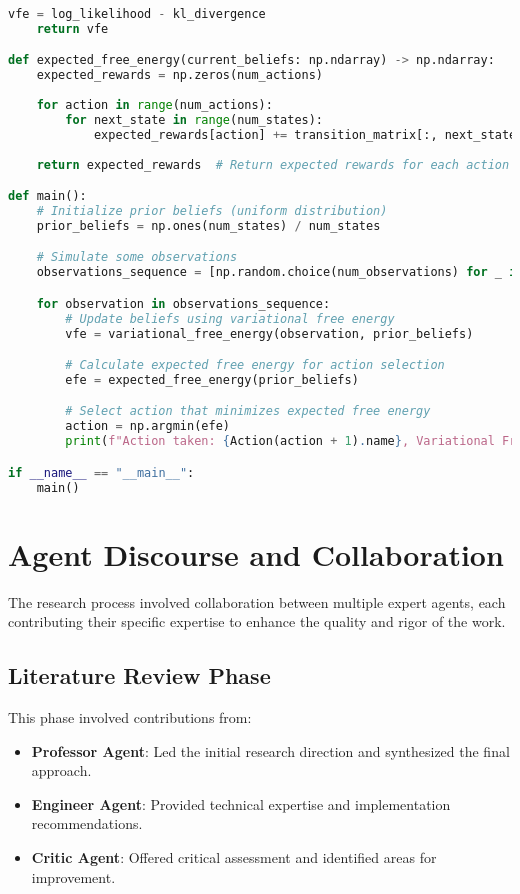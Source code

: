 \documentclass[11pt,a4paper]{article}
\begin{document}
\begin{lstlisting}[language=Python, caption={Full implementation code}]
    vfe = log_likelihood - kl_divergence
    return vfe

def expected_free_energy(current_beliefs: np.ndarray) -> np.ndarray:
    expected_rewards = np.zeros(num_actions)
    
    for action in range(num_actions):
        for next_state in range(num_states):
            expected_rewards[action] += transition_matrix[:, next_state, action] * reward_function(State(next_state + 1), Action(action + 1))
    
    return expected_rewards  # Return expected rewards for each action

def main():
    # Initialize prior beliefs (uniform distribution)
    prior_beliefs = np.ones(num_states) / num_states

    # Simulate some observations
    observations_sequence = [np.random.choice(num_observations) for _ in range(10)]

    for observation in observations_sequence:
        # Update beliefs using variational free energy
        vfe = variational_free_energy(observation, prior_beliefs)

        # Calculate expected free energy for action selection
        efe = expected_free_energy(prior_beliefs)

        # Select action that minimizes expected free energy
        action = np.argmin(efe)
        print(f"Action taken: {Action(action + 1).name}, Variational Free Energy: {vfe:.2f}, Expected Free Energy: {efe[action]:.2f}")

if __name__ == "__main__":
    main()
\end{lstlisting}


\section{Agent Discourse and Collaboration}

The research process involved collaboration between multiple expert agents, each contributing their specific expertise to enhance the quality and rigor of the work.


\subsection{Literature Review Phase}


This phase involved contributions from:

\begin{itemize}
\item \textbf{Professor Agent}: Led the initial research direction and synthesized the final approach.
\item \textbf{Engineer Agent}: Provided technical expertise and implementation recommendations.
\item \textbf{Critic Agent}: Offered critical assessment and identified areas for improvement.
\end{itemize}
\end{document}

